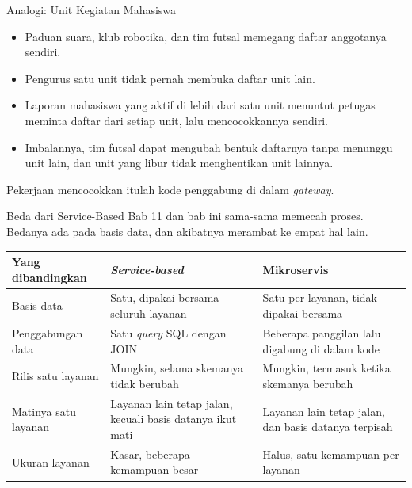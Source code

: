 \documentclass[aspectratio=169, table, 12pt]{beamer}
\begin{document}
\begin{frame}{{\Large Analogi: Unit Kegiatan Mahasiswa}}
  \vspace{10pt}
  \begin{itemize}\small
    \item Paduan suara, klub robotika, dan tim futsal memegang daftar
          anggotanya sendiri.
    \item Pengurus satu unit tidak pernah membuka daftar unit lain.
    \item Laporan mahasiswa yang aktif di lebih dari satu unit menuntut
          petugas meminta daftar dari setiap unit, lalu mencocokkannya
          sendiri.
    \item Imbalannya, tim futsal dapat mengubah bentuk daftarnya tanpa
          menunggu unit lain, dan unit yang libur tidak menghentikan unit
          lainnya.
  \end{itemize}

  \vspace{10pt}
  {\small Pekerjaan mencocokkan itulah kode penggabung di dalam \textit{gateway}.}
\end{frame}

\begin{frame}{{\Large Beda dari Service-Based}}
  \vspace{10pt}
  {\small Bab 11 dan bab ini sama-sama memecah proses. Bedanya ada pada basis
  data, dan akibatnya merambat ke empat hal lain.}

  \vspace{4pt}
  \centering
  \scriptsize
  \begin{tabularx}{0.96\textwidth}{|l|>{\raggedright\arraybackslash}X|>{\raggedright\arraybackslash}X|}
    \hline
    \textbf{Yang dibandingkan} & \textbf{\textit{Service-based}} & \textbf{Mikroservis} \\
    \hline
    Basis data & Satu, dipakai bersama seluruh layanan & Satu per layanan, tidak dipakai bersama \\
    \hline
    Penggabungan data & Satu \textit{query} SQL dengan JOIN & Beberapa panggilan lalu digabung di dalam kode \\
    \hline
    Rilis satu layanan & Mungkin, selama skemanya tidak berubah & Mungkin, termasuk ketika skemanya berubah \\
    \hline
    Matinya satu layanan & Layanan lain tetap jalan, kecuali basis datanya ikut mati & Layanan lain tetap jalan, dan basis datanya terpisah \\
    \hline
    Ukuran layanan & Kasar, beberapa kemampuan besar & Halus, satu kemampuan per layanan \\
    \hline
  \end{tabularx}
\end{frame}
\end{document}
